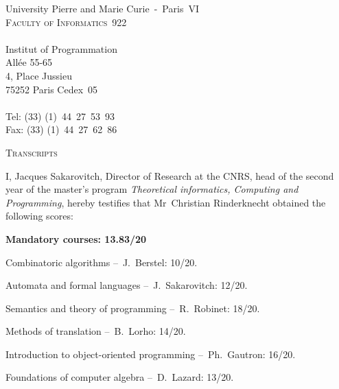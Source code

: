 \documentclass[a4paper,11pt,twoside]{article}
\begin{document}
\thispagestyle{empty}

\begin{flushleft}
University Pierre and Marie Curie~-~Paris~VI\\
\textsc{Faculty of Informatics~922}\\
\ \\
Institut of Programmation\\
All\'ee 55-65\\
4, Place Jussieu\\
75252 Paris Cedex~05\\
\ \\
Tel: (33) (1)~44~27~53~93\\
Fax: (33) (1)~44~27~62~86
\end{flushleft}

\bigskip\bigskip

\begin{center}
\textsc{\Large Transcripts}
\end{center}

\bigskip

I, Jacques Sakarovitch, Director of Research at the CNRS, head of the
second year of the master's program \emph{Theoretical informatics,
  Computing and Programming}, hereby testifies that Mr~Christian
Rinderknecht obtained the following scores:

\bigskip

\noindent\textbf{Mandatory courses: 13.83/20} 
\begin{itemize*}

  \item Combinatoric algorithms --~J.~Berstel: 10/20.

  \item Automata and formal languages --~J.~Sakarovitch: 12/20.

  \item Semantics and theory of programming --~R.~Robinet: 18/20.

  \item Methods of translation --~B.~Lorho: 14/20.

  \item Introduction to object-oriented programming --~Ph.~Gautron:
    16/20.

  \item Foundations of computer algebra --~D.~Lazard: 13/20.

\end{itemize*}

\bigskip
\end{document}
